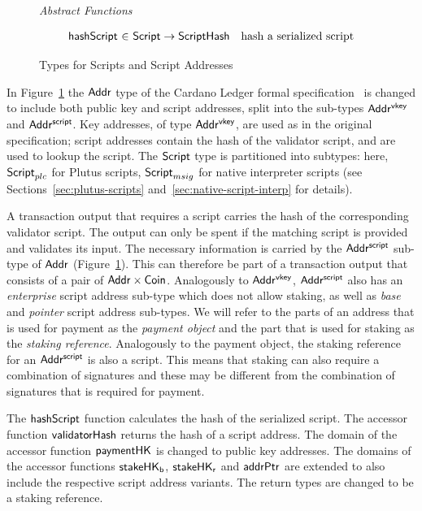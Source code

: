 \documentclass[11pt,a4paper,dvipsnames,twosided]{article}
\newcommand{\Addr}{\type{Addr}}
\newcommand{\AddrVKey}{\type{Addr^{vkey}}}
\newcommand{\Coin}{\type{Coin}}
\newcommand{\AddrScr}{\type{Addr^{script}}}
\newcommand{\HashScr}{\type{ScriptHash}}
\newcommand{\Script}{\type{Script}}
\newcommand{\ScriptPlutus}{\Script_{plc}}
\newcommand{\ScriptMSig}{\Script_{msig}}
\theoremstyle{definition}
\begin{document}
\begin{figure}[hbt]
  \emph{Abstract Functions}

  \begin{equation*}
    \begin{array}{r@{~\in~}lr}
      \fun{hashScript} & \Script \to \HashScr & \text{hash a serialized script}
    \end{array}
  \end{equation*}

  \caption{Types for Scripts and Script Addresses}
  \label{fig:types-scripts}
\end{figure}

In Figure~\ref{fig:types-scripts} the $\Addr$ type of the Cardano Ledger formal
specification~\cite{shelley_spec} is changed to include both public key and
script addresses, split into the sub-types $\AddrVKey$ and $\AddrScr$. Key
addresses, of type $\AddrVKey$, are used as in the original specification;
script addresses contain the hash of the validator script, and are used to
lookup the script. The $\Script$ type is partitioned into subtypes: here,
$\ScriptPlutus$ for Plutus scripts, $\ScriptMSig$ for native interpreter scripts
(see Sections~\ref{sec:plutus-scripts} and~\ref{sec:native-script-interp} for
details).

A transaction output that requires a script carries the hash of the
corresponding validator script. The output can only be spent if the matching
script is provided and validates its input. The necessary information is carried
by the $\AddrScr$ sub-type of $\Addr$ (Figure~\ref{fig:types-scripts}).  This
can therefore be part of a transaction output that consists of a pair of
$\Addr\times\Coin$. Analogously to $\AddrVKey$, $\AddrScr$ also has an
\emph{enterprise} script address sub-type which does not allow staking, as well
as \emph{base} and \emph{pointer} script address sub-types. We will refer to the
parts of an address that is used for payment as the \emph{payment object} and
the part that is used for staking as the \emph{staking reference}. Analogously
to the payment object, the staking reference for an $\AddrScr$ is also a script.
This means that staking can also require a combination of signatures and these
may be different from the combination of signatures that is required for
payment.

The $\mathsf{hashScript}$ function calculates the hash of the serialized
script. The accessor function $\mathsf{validatorHash}$ returns the hash of a script
address. The domain of the accessor function $\mathsf{paymentHK}$ is changed to
public key addresses. The domains of the accessor functions $\mathsf{stakeHK_b}$,
$\mathsf{stakeHK_{r}}$ and $\mathsf{addrPtr}$ are extended to also include the
respective script address variants. The return types are changed to be a staking
reference.
\end{document}
